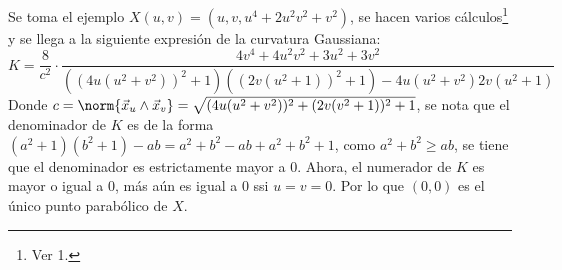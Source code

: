 \documentclass{homework}
\begin{document}
\begin{sol}[3]
    Se toma el ejemplo \(X(u,v)=(u,v,u^4+2u^2v^2+v^2)\), se hacen varios cálculos\footnote{Ver 1.} y se llega a la siguiente expresión de la curvatura Gaussiana:
    \begin{equation*}
        K=\frac8{c^2}\cdot\frac{4v^4+4u^2v^2+3u^2+3v^2}{((4u(u^2+v^2))^2+1)((2v(u^2+1))^2+1)-4u(u^2+v^2)2v(u^2+1)}
    \end{equation*}
    Donde \(c=\norm{\vec{x}_u\wedge\vec{x}_v}=\sqrt{(4u(u^2+v^2))^2+(2v(v^2+1))^2+1}\), se nota que el denominador de \(K\) es de la forma \((a^2+1)(b^2+1)-ab=a^2+b^2-ab+a^2+b^2+1\), como \(a^2+b^2\geq ab\), se tiene que el denominador es estrictamente mayor a \(0\). Ahora, el numerador de \(K\) es mayor o igual a \(0\), más aún es igual a \(0\) ssi \(u=v=0\). Por lo que \((0,0)\) es el único punto parabólico de \(X\).
\end{sol}
\end{document}
